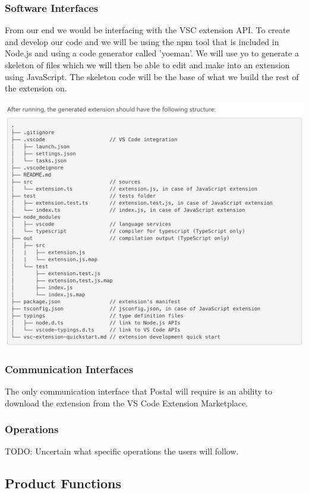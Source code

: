 \documentclass[letterpaper,10pt,titlepage,draftclsnofoot,onecolumn,onesided] {IEEEtran}
\begin{document}
\subsubsection{Software Interfaces}
From our end we would be interfacing with the VSC extension API. To create and develop our code and we will be using the npm tool that is included in Node.js and using a code generator called 'yoeman'. We will use yo to generate a skeleton of files which we will then be able to edit and make into an extension using JavaScript. The skeleton code will be the base of what we build the rest of the extension on. 

\includegraphics[scale=0.5]{fileStructure.png}
\subsubsection{Communication Interfaces}
The only communication interface that Postal will require is an ability to download the extension from the VS Code Extension Marketplace. 

\subsubsection{Operations}
TODO: Uncertain what specific operations the users will follow.

\subsection{Product Functions}
\end{document}
